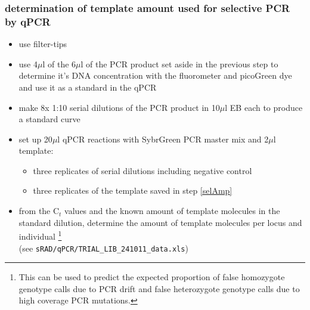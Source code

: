 \subsubsection
{determination of template amount used for selective PCR by qPCR}
\begin{itemize}
\item {\color{red}use filter-tips}
\item use 4$\mu$l of the 6$\mu$l of the PCR product set aside in the previous step to determine it's DNA concentration with the fluorometer and picoGreen dye and use it as a standard in the qPCR
\item make 8x 1:10 serial dilutions of the PCR product in 10$\mu$l EB each to produce a standard curve
\item set up 20$\mu$l qPCR reactions with SybrGreen PCR master mix and 2$\mu$l template: 
	\begin{itemize}
	\item three replicates of serial dilutions including negative control
	\item three replicates of the template saved in step \ref{selAmp}
	\end{itemize}
\item from the C$_{t}$ values and the known amount of template molecules in the standard dilution, determine the amount of template molecules per locus and individual \footnote{This can be used to predict the expected proportion of false homozygote genotype calls due to PCR drift and false heterozygote genotype calls due to high coverage PCR mutations.} \\(see \texttt{sRAD/qPCR/TRIAL\_LIB\_241011\_data.xls})
\end{itemize}


